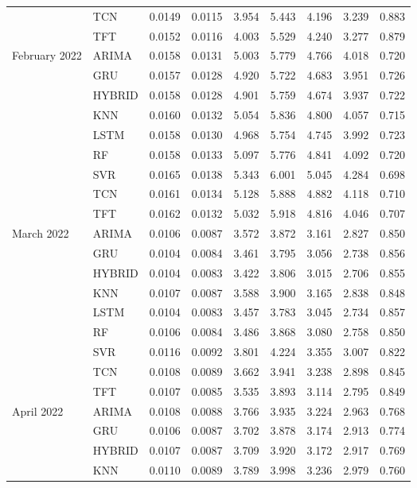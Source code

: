 \begin{tabular}{lllllllll}
 & TCN & 0.0149 & 0.0115 & 3.954 & 5.443 & 4.196 & 3.239 & 0.883 \\
 & TFT & 0.0152 & 0.0116 & 4.003 & 5.529 & 4.240 & 3.277 & 0.879 \\
February 2022 & ARIMA & 0.0158 & 0.0131 & 5.003 & 5.779 & 4.766 & 4.018 & 0.720 \\
 & GRU & 0.0157 & 0.0128 & 4.920 & 5.722 & 4.683 & 3.951 & 0.726 \\
 & HYBRID & 0.0158 & 0.0128 & 4.901 & 5.759 & 4.674 & 3.937 & 0.722 \\
 & KNN & 0.0160 & 0.0132 & 5.054 & 5.836 & 4.800 & 4.057 & 0.715 \\
 & LSTM & 0.0158 & 0.0130 & 4.968 & 5.754 & 4.745 & 3.992 & 0.723 \\
 & RF & 0.0158 & 0.0133 & 5.097 & 5.776 & 4.841 & 4.092 & 0.720 \\
 & SVR & 0.0165 & 0.0138 & 5.343 & 6.001 & 5.045 & 4.284 & 0.698 \\
 & TCN & 0.0161 & 0.0134 & 5.128 & 5.888 & 4.882 & 4.118 & 0.710 \\
 & TFT & 0.0162 & 0.0132 & 5.032 & 5.918 & 4.816 & 4.046 & 0.707 \\
March 2022 & ARIMA & 0.0106 & 0.0087 & 3.572 & 3.872 & 3.161 & 2.827 & 0.850 \\
 & GRU & 0.0104 & 0.0084 & 3.461 & 3.795 & 3.056 & 2.738 & 0.856 \\
 & HYBRID & 0.0104 & 0.0083 & 3.422 & 3.806 & 3.015 & 2.706 & 0.855 \\
 & KNN & 0.0107 & 0.0087 & 3.588 & 3.900 & 3.165 & 2.838 & 0.848 \\
 & LSTM & 0.0104 & 0.0083 & 3.457 & 3.783 & 3.045 & 2.734 & 0.857 \\
 & RF & 0.0106 & 0.0084 & 3.486 & 3.868 & 3.080 & 2.758 & 0.850 \\
 & SVR & 0.0116 & 0.0092 & 3.801 & 4.224 & 3.355 & 3.007 & 0.822 \\
 & TCN & 0.0108 & 0.0089 & 3.662 & 3.941 & 3.238 & 2.898 & 0.845 \\
 & TFT & 0.0107 & 0.0085 & 3.535 & 3.893 & 3.114 & 2.795 & 0.849 \\
April 2022 & ARIMA & 0.0108 & 0.0088 & 3.766 & 3.935 & 3.224 & 2.963 & 0.768 \\
 & GRU & 0.0106 & 0.0087 & 3.702 & 3.878 & 3.174 & 2.913 & 0.774 \\
 & HYBRID & 0.0107 & 0.0087 & 3.709 & 3.920 & 3.172 & 2.917 & 0.769 \\
 & KNN & 0.0110 & 0.0089 & 3.789 & 3.998 & 3.236 & 2.979 & 0.760 \\

\end{tabular}
